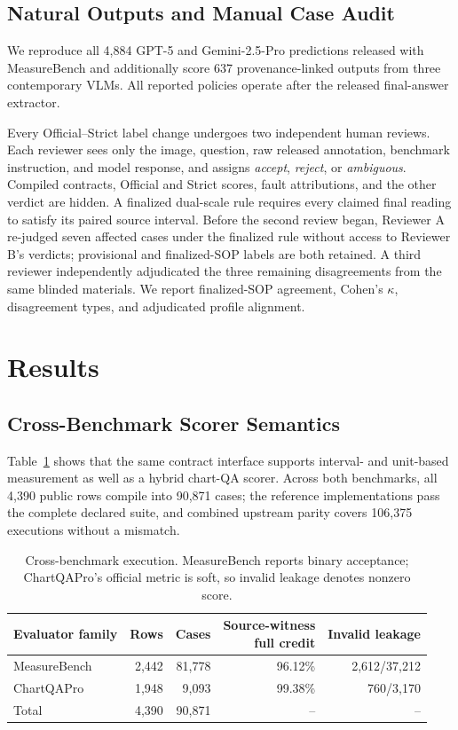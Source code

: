 \documentclass[a4paper]{llncs}
\begin{document}
\subsection{Natural Outputs and Manual Case Audit}
We reproduce all 4,884 GPT-5 and Gemini-2.5-Pro predictions released with MeasureBench and additionally score 637 provenance-linked outputs from three contemporary VLMs. All reported policies operate after the released final-answer extractor.

Every Official--Strict label change undergoes two independent human reviews. Each reviewer sees only the image, question, raw released annotation, benchmark instruction, and model response, and assigns \emph{accept}, \emph{reject}, or \emph{ambiguous}. Compiled contracts, Official and Strict scores, fault attributions, and the other verdict are hidden. A finalized dual-scale rule requires every claimed final reading to satisfy its paired source interval. Before the second review began, Reviewer A re-judged seven affected cases under the finalized rule without access to Reviewer B's verdicts; provisional and finalized-SOP labels are both retained. A third reviewer independently adjudicated the three remaining disagreements from the same blinded materials. We report finalized-SOP agreement, Cohen's $\kappa$, disagreement types, and adjudicated profile alignment.

\section{Results}
\subsection{Cross-Benchmark Scorer Semantics}
Table~\ref{tab:xbench} shows that the same contract interface supports interval- and unit-based measurement as well as a hybrid chart-QA scorer. Across both benchmarks, all 4,390 public rows compile into 90,871 cases; the reference implementations pass the complete declared suite, and combined upstream parity covers 106,375 executions without a mismatch.

\begin{table}[t]
\centering
\small
\caption{Cross-benchmark execution. MeasureBench reports binary acceptance; ChartQAPro's official metric is soft, so invalid leakage denotes nonzero score.}
\label{tab:xbench}
\setlength{\tabcolsep}{3.2pt}
\begin{tabular}{lrrrr}
\toprule
Evaluator family & Rows & Cases & \shortstack{Source-witness\\full credit} & Invalid leakage\\
\midrule
MeasureBench & 2,442 & 81,778 & 96.12\% & 2,612/37,212\\
ChartQAPro & 1,948 & 9,093 & 99.38\% & 760/3,170\\
\midrule
Total & 4,390 & 90,871 & -- & --\\
\bottomrule
\end{tabular}
\end{table}
\end{document}
